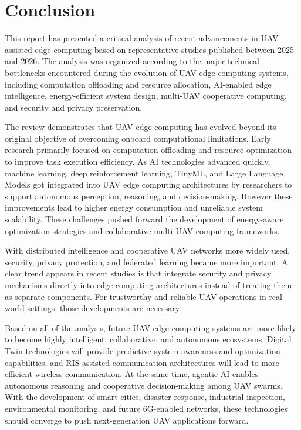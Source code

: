\documentclass[a4paper, 12pt]{article}
\begin{document}
\section*{Conclusion}
This report has presented a critical analysis of recent advancements in UAV-assisted edge computing based on representative studies published between 2025 and 2026. The analysis was organized according to the major technical bottlenecks encountered during the evolution of UAV edge computing systems, including computation offloading and resource allocation, AI-enabled edge intelligence, energy-efficient system design, multi-UAV cooperative computing, and security and privacy preservation.

The review demonstrates that UAV edge computing has evolved beyond its original objective of overcoming onboard computational limitations. Early research primarily focused on computation offloading and resource optimization to improve task execution efficiency. As AI technologies advanced quickly, machine learning, deep reinforcement learning, TinyML, and Large Language Models got integrated into UAV edge computing architectures by researchers to support autonomous perception, reasoning, and decision-making. However these improvements lead to higher energy consumption and unreliable system scalability. These challenges pushed forward the development of energy-aware optimization strategies and collaborative multi-UAV computing frameworks.

With distributed intelligence and cooperative UAV networks more widely used, security, privacy protection, and federated learning became more important. A clear trend appears in recent studies is that integrate security and privacy mechanisms directly into edge computing architectures instead of treating them as separate components. For trustworthy and reliable UAV operations in real-world settings, those developments are necessary.

Based on all of the analysis, future UAV edge computing systems are more likely to become highly intelligent, collaborative, and autonomous ecosystems. Digital Twin technologies will provide predictive system awareness and optimization capabilities, and RIS-assisted communication architectures will lead to more efficient wireless communication. At the same time, agentic AI enables autonomous reasoning and cooperative decision-making among UAV swarms. With the development of smart cities, disaster response, industrial inspection, environmental monitoring, and future 6G-enabled networks, these technologies should converge to push next-generation UAV applications forward.
\newpage

\printbibliography
\end{document}
